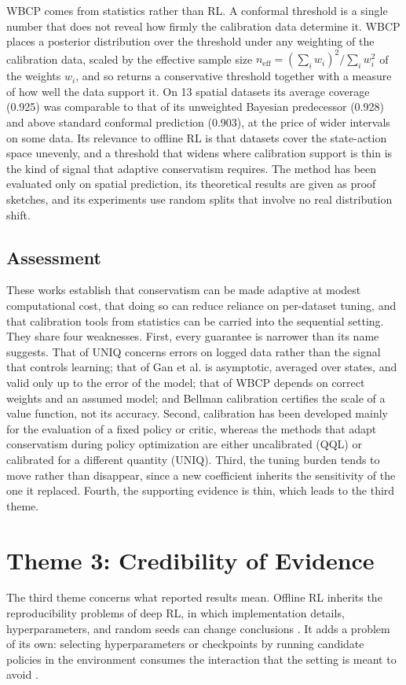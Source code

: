 \documentclass[journal]{IEEEtran}
\begin{document}
WBCP \cite{lou2026wbcp} comes from statistics rather than RL. A conformal threshold is a single number that does not reveal how firmly the calibration data determine it. WBCP places a posterior distribution over the threshold under any weighting of the calibration data, scaled by the effective sample size $n_{\mathrm{eff}} = (\sum_i w_i)^2 / \sum_i w_i^2$ of the weights $w_i$, and so returns a conservative threshold together with a measure of how well the data support it. On 13 spatial datasets its average coverage (0.925) was comparable to that of its unweighted Bayesian predecessor (0.928) and above standard conformal prediction (0.903), at the price of wider intervals on some data. Its relevance to offline RL is that datasets cover the state-action space unevenly, and a threshold that widens where calibration support is thin is the kind of signal that adaptive conservatism requires. The method has been evaluated only on spatial prediction, its theoretical results are given as proof sketches, and its experiments use random splits that involve no real distribution shift.

\subsection{Assessment}
These works establish that conservatism can be made adaptive at modest computational cost, that doing so can reduce reliance on per-dataset tuning, and that calibration tools from statistics can be carried into the sequential setting. They share four weaknesses. First, every guarantee is narrower than its name suggests. That of UNIQ concerns errors on logged data rather than the signal that controls learning; that of Gan et al. is asymptotic, averaged over states, and valid only up to the error of the model; that of WBCP depends on correct weights and an assumed model; and Bellman calibration certifies the scale of a value function, not its accuracy. Second, calibration has been developed mainly for the evaluation of a fixed policy or critic, whereas the methods that adapt conservatism during policy optimization are either uncalibrated (QQL) or calibrated for a different quantity (UNIQ). Third, the tuning burden tends to move rather than disappear, since a new coefficient inherits the sensitivity of the one it replaced. Fourth, the supporting evidence is thin, which leads to the third theme.

\section{Theme 3: Credibility of Evidence}
\label{sec:theme3}
The third theme concerns what reported results mean. Offline RL inherits the reproducibility problems of deep RL, in which implementation details, hyperparameters, and random seeds can change conclusions \cite{henderson2018matters,agarwal2021precipice}. It adds a problem of its own: selecting hyperparameters or checkpoints by running candidate policies in the environment consumes the interaction that the setting is meant to avoid \cite{paine2020hyperparameter}.
\end{document}
